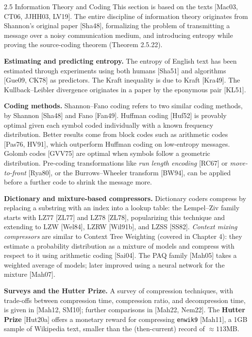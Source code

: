 \documentclass[aspectratio=169,10pt]{beamer}
\begin{document}
\begin{frame}[allowframebreaks]{2.5 Information Theory and Coding}
  This section is based on the texts [Mac03, CT06, JJHH03, LV19]. The
  entire discipline of information theory originates from Shannon's
  original paper [Sha48], formalizing the problem of transmitting a message
  over a noisy communication medium, and introducing entropy while proving
  the source-coding theorem (Theorem 2.5.22).

  \textbf{Estimating and predicting entropy.} The entropy of English text
  has been estimated through experiments using both humans [Sha51] and
  algorithms [Gue09, CK78] as predictors. The Kraft inequality is due to
  Kraft [Kra49]. The Kullback--Leibler divergence originates in a paper by
  the eponymous pair [KL51].

  \framebreak

  \textbf{Coding methods.} Shannon--Fano coding refers to two similar coding
  methods, by Shannon [Sha48] and Fano [Fan49]. Huffman coding [Huf52] is
  provably optimal given each symbol coded individually with a known
  frequency distribution. Better results come from block codes such as
  arithmetic codes [Pas76, HV91], which outperform Huffman coding on
  low-entropy messages. Golomb codes [GVV75] are optimal when symbols follow
  a geometric distribution. Pre-coding transformations like \emph{run length
  encoding} [RC67] or \emph{move-to-front} [Rya80], or the Burrows--Wheeler
  transform [BW94], can be applied before a further code to shrink the
  message more.

  \framebreak

  \textbf{Dictionary and mixture-based compressors.} Dictionary coders
  compress by replacing a substring with an index into a lookup table: the
  Lempel--Ziv family starts with LZ77 [ZL77] and LZ78 [ZL78], popularizing
  this technique and extending to LZW [Wel84], LZRW [Wil91b], and LZSS
  [SS82]. \emph{Context mixing compressors} are similar to Context Tree
  Weighting (covered in Chapter 4): they estimate a probability
  distribution as a mixture of models and compress with respect to it using
  arithmetic coding [Sai04]. The PAQ family [Mah05] takes a weighted average
  of models; later improved using a neural network for the mixture [Mah07].

  \framebreak

  \textbf{Surveys and the Hutter Prize.} A survey of compression techniques,
  with trade-offs between compression time, compression ratio, and
  decompression time, is given in [Mah12, SM10]; further comparisons in
  [Mah22, Nem22]. The \textbf{Hutter Prize} [Hut20a] offers a monetary
  reward for compressing \texttt{enwik9} [Mah11], a 1GB sample of Wikipedia
  text, smaller than the (then-current) record of $\approx113$MB.
\end{frame}
\end{document}
